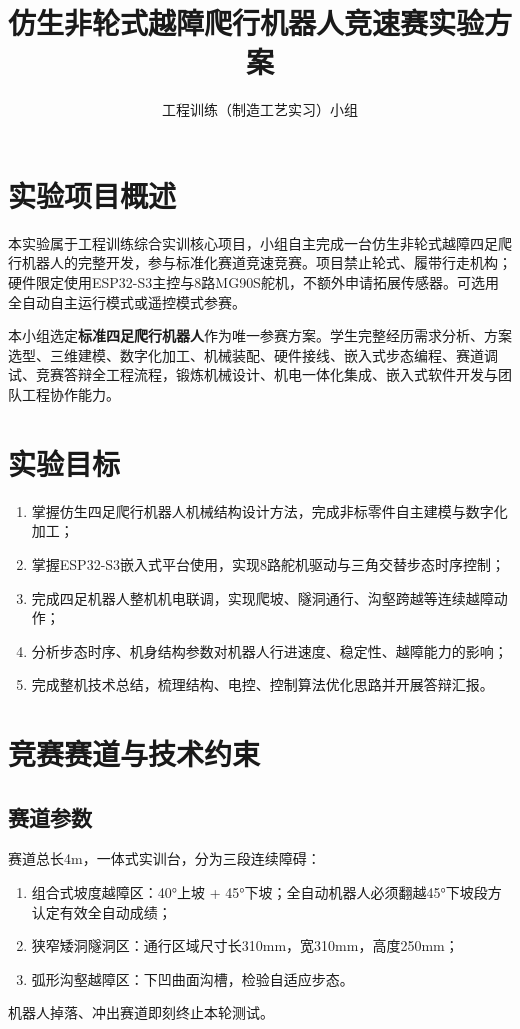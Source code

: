 \documentclass[11pt,a4paper]{article}
\begin{document}
\title{仿生非轮式越障爬行机器人竞速赛实验方案}
\author{工程训练（制造工艺实习）小组}
\date{}
\maketitle

\section{实验项目概述}
本实验属于工程训练综合实训核心项目，小组自主完成一台仿生非轮式越障四足爬行机器人的完整开发，参与标准化赛道竞速竞赛。项目禁止轮式、履带行走机构；硬件限定使用ESP32-S3主控与8路MG90S舵机，不额外申请拓展传感器。可选用全自动自主运行模式或遥控模式参赛。

本小组选定\textbf{标准四足爬行机器人}作为唯一参赛方案。学生完整经历需求分析、方案选型、三维建模、数字化加工、机械装配、硬件接线、嵌入式步态编程、赛道调试、竞赛答辩全工程流程，锻炼机械设计、机电一体化集成、嵌入式软件开发与团队工程协作能力。

\section{实验目标}
\begin{enumerate}[itemsep=0.3em]
    \item 掌握仿生四足爬行机器人机械结构设计方法，完成非标零件自主建模与数字化加工；
    \item 掌握ESP32-S3嵌入式平台使用，实现8路舵机驱动与三角交替步态时序控制；
    \item 完成四足机器人整机机电联调，实现爬坡、隧洞通行、沟壑跨越等连续越障动作；
    \item 分析步态时序、机身结构参数对机器人行进速度、稳定性、越障能力的影响；
    \item 完成整机技术总结，梳理结构、电控、控制算法优化思路并开展答辩汇报。
\end{enumerate}

\section{竞赛赛道与技术约束}
\subsection{赛道参数}
赛道总长4m，一体式实训台，分为三段连续障碍：
\begin{enumerate}
    \item 组合式坡度越障区：40°上坡 + 45°下坡；全自动机器人必须翻越45°下坡段方认定有效全自动成绩；
    \item 狭窄矮洞隧洞区：通行区域尺寸长310mm，宽310mm，高度250mm；
    \item 弧形沟壑越障区：下凹曲面沟槽，检验自适应步态。
\end{enumerate}
机器人掉落、冲出赛道即刻终止本轮测试。
\end{document}
